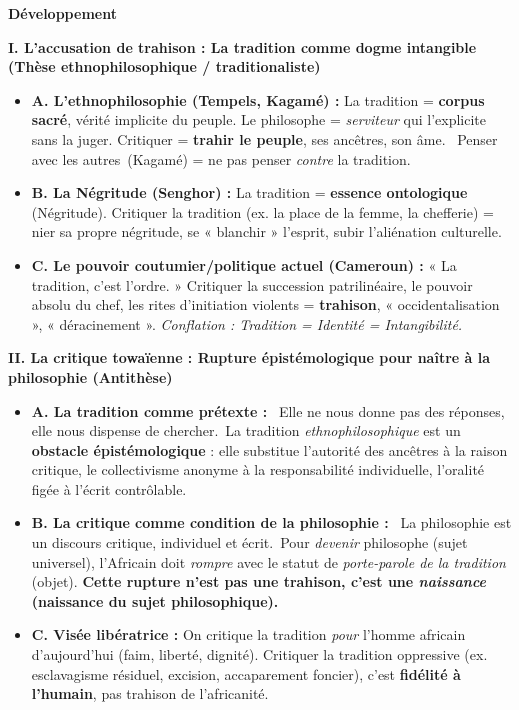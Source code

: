 \documentclass[11pt]{article}
\newcommand{\cle}[1]{{\popxbold\color{popdark}#1}}
\begin{document}
\begin{corrige}
\textbf{Développement}

\textbf{I. L'accusation de trahison : La tradition comme dogme intangible (Thèse ethnophilosophique / traditionaliste)}
\begin{itemize}
\item \textbf{A. L'ethnophilosophie (Tempels, Kagamé) :} La tradition = \textbf{corpus sacré}, vérité implicite du peuple. Le philosophe = \emph{serviteur} qui l'explicite sans la juger. Critiquer = \textbf{trahir le peuple}, ses ancêtres, son âme. \guillemotleft~Penser avec les autres~\guillemotright (Kagamé) = ne pas penser \emph{contre} la tradition.
\item \textbf{B. La Négritude (Senghor) :} La tradition = \textbf{essence ontologique} (Négritude). Critiquer la tradition (ex. la place de la femme, la chefferie) = nier sa propre négritude, se « blanchir » l'esprit, subir l'aliénation culturelle.
\item \textbf{C. Le pouvoir coutumier/politique actuel (Cameroun) :} « La tradition, c'est l'ordre. » Critiquer la succession patrilinéaire, le pouvoir absolu du chef, les rites d'initiation violents = \textbf{trahison}, « occidentalisation », « déracinement ». \emph{Conflation : Tradition = Identité = Intangibilité.}
\end{itemize}

\textbf{II. La critique towaïenne : Rupture épistémologique pour naître à la philosophie (Antithèse)}
\begin{itemize}
\item \textbf{A. La tradition comme \cle{prétexte} :} \guillemotleft~Elle ne nous donne pas des réponses, elle nous dispense de chercher.~\guillemotright La tradition \emph{ethnophilosophique} est un \textbf{obstacle épistémologique} : elle substitue l'autorité des ancêtres à la raison critique, le collectivisme anonyme à la responsabilité individuelle, l'oralité figée à l'écrit contrôlable.
\item \textbf{B. La critique comme condition de la philosophie :} \guillemotleft~La philosophie est un discours critique, individuel et écrit.~\guillemotright Pour \emph{devenir} philosophe (sujet universel), l'Africain doit \emph{rompre} avec le statut de \emph{porte-parole de la tradition} (objet). \textbf{Cette rupture n'est pas une trahison, c'est une \emph{naissance} (naissance du sujet philosophique).}
\item \textbf{C. Visée libératrice :} On critique la tradition \emph{pour} l'homme africain d'aujourd'hui (faim, liberté, dignité). Critiquer la tradition oppressive (ex. esclavagisme résiduel, excision, accaparement foncier), c'est \textbf{fidélité à l'humain}, pas trahison de l'africanité.
\end{itemize}


\end{corrige}
\end{document}
